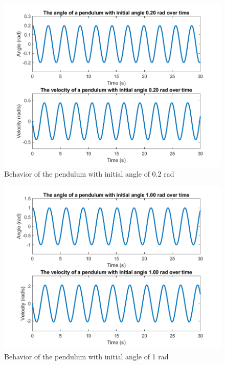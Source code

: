 \documentclass[14pt]{article}
\begin{document}
\begin{figure}[H]
  \includegraphics[width=14cm]{./output/assignment1/0.20_rad.png}
  \caption{Behavior of the pendulum with initial angle of 0.2 rad}
  \label{fig:figure1}
\end{figure}

\begin{figure}[H]
  \includegraphics[width=14cm]{./output/assignment1/1.00_rad.png}
  \caption{Behavior of the pendulum with initial angle of 1 rad}
  \label{fig:figure2}
\end{figure}
\end{document}
